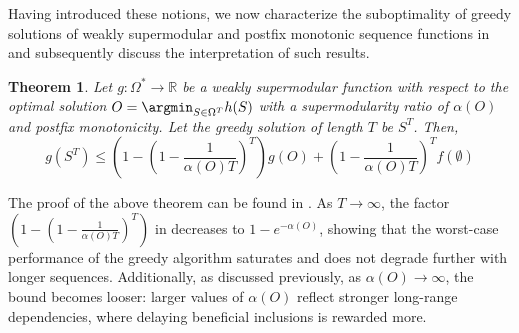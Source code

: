 \documentclass{article} %
\newtheorem{theorem}{Theorem}[section]
\begin{document}

Having introduced these notions, we now characterize the suboptimality of greedy solutions of weakly supermodular and 
postfix monotonic sequence functions in  and subsequently discuss the interpretation of such results.



\begin{theorem} \label{th:suboptgreedy}
    Let $g: \Omega^* \to \mathbb{R}$ be a weakly supermodular function with respect to the optimal solution $O = \argmin_{S \in \Omega^T} h(S)$ with a supermodularity ratio of $\alpha(O)$ and 
    postfix monotonicity. Let the greedy solution of length $T$ be $S^T$. Then,
    \begin{equation*}
        g(S^T) \leq  \left(1 - \left(1 - \frac{1}{\alpha(O) T}\right)^T\right)
        g(O) +  \left(1 - \frac{1}{\alpha(O) T}\right)^Tf(\emptyset)
    \end{equation*}
\end{theorem}

The proof of the above theorem can be found in . As $T \to \infty$, the factor $\left(1 - \left(1 - \frac{1}{\alpha(O) T}\right)^T\right)$ in  decreases to $1 - e^{-\alpha(O)}$, showing that the worst-case performance of the greedy algorithm saturates and does not degrade further with longer sequences. Additionally, as discussed previously, as $\alpha(O) \to\infty$, the bound becomes looser: larger values of $\alpha(O)$ reflect stronger long-range dependencies, where delaying beneficial inclusions is rewarded more.

\end{document}
